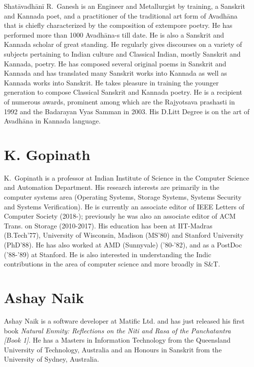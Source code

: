 Shatāvadhānī R.~Ganesh is an Engineer and Metallurgist by training, a Sanskrit and Kannada
poet, and a practitioner of the traditional art form of Avadhāna that is chiefly characterized by
the composition of extempore poetry. He has performed more than 1000 Avadhāna-s till date.
He is also a Sanskrit and Kannada scholar of great standing. He regularly gives discourses on
a variety of subjects pertaining to Indian culture and Classical Indian, mostly Sanskrit and
Kannada, poetry. He has composed several original poems in Sanskrit and Kannada and has
translated many Sanskrit works into Kannada as well as Kannada works into Sanskrit. He
takes pleasure in training the younger generation to compose Classical Sanskrit and Kannada
poetry. He is a recipient of numerous awards, prominent among which are the Rajyotsava
prashasti in 1992 and the Badarayan Vyas Samman in 2003. His D.Litt Degree is on the art of
Avadhāna in Kannada language.

\section*{K. Gopinath}

K.~Gopinath is a professor at Indian Institute of Science in the Computer Science and
Automation Department. His research interests are primarily in the computer systems area
(Operating Systems, Storage Systems, Systems Security and Systems Verification). He is
currently an associate editor of IEEE Letters of Computer Society (2018-); previously he was
also an associate editor of ACM Trans. on Storage (2010-2017). His education has been at
IIT-Madras (B.Tech'77), University of Wisconsin, Madison (MS'80) and Stanford University
(PhD'88). He has also worked at AMD (Sunnyvale) ('80-'82), and as a PostDoc ('88-'89) at
Stanford. He is also interested in understanding the Indic contributions in the area of
computer science and more broadly in S\&T.

\section*{Ashay Naik}

Ashay Naik is a software developer at Matific Ltd. and has just released his first book
\textsl{Natural Enmity: Reflections on the Niti and Rasa of the Panchatantra [Book 1]}. He has a
Masters in Information Technology from the Queensland University of Technology,
Australia and an Honours in Sanskrit from the University of Sydney, Australia.

